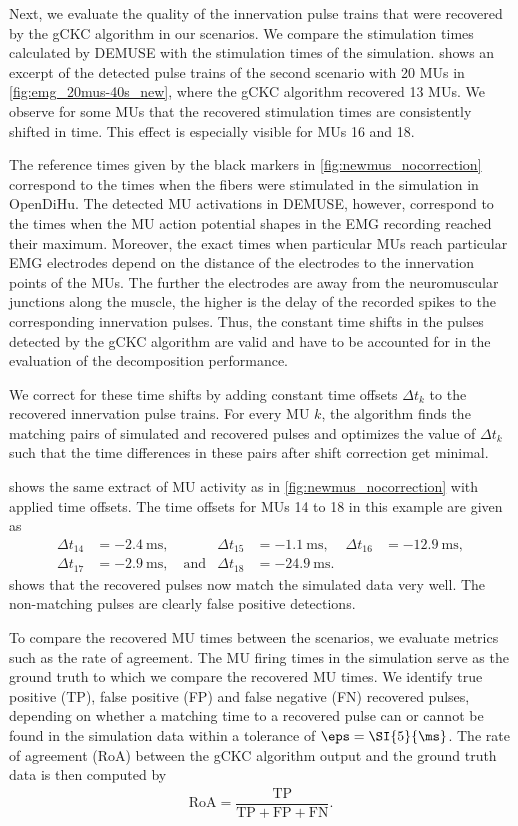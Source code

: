 Next, we evaluate the quality of the innervation pulse trains that were recovered by the gCKC algorithm in our scenarios. We compare the stimulation times calculated by DEMUSE with the stimulation times of the simulation.  shows an excerpt of the detected pulse trains of the second scenario with 20 MUs in \cref{fig:emg_20mus-40s_new}, where the gCKC algorithm recovered 13 MUs.  We observe for some MUs that the recovered stimulation times are consistently shifted in time. This effect is especially visible for MUs 16 and 18. 

The reference times given by the black markers in \cref{fig:newmus_nocorrection} correspond to the times when the fibers were stimulated in the simulation in OpenDiHu. The detected MU activations in DEMUSE, however, correspond to the times when the MU action potential shapes in the EMG recording reached their maximum.
Moreover, the exact times when particular MUs reach particular EMG electrodes  depend on the distance of the electrodes to the innervation points of the MUs. The further the electrodes are away from the neuromuscular junctions along the muscle, the higher is the delay of the recorded spikes to the corresponding innervation pulses. Thus, the constant time shifts in the pulses detected by the gCKC algorithm are valid and have to be accounted for in the evaluation of the decomposition performance.

We correct for these time shifts by adding constant time offsets $\Delta t_k$ to the recovered innervation pulse trains. For every MU $k$, the algorithm finds the matching pairs of simulated and recovered pulses and optimizes the value of $\Delta t_k$ such that the time differences in these pairs after shift correction get minimal.

 shows the same extract of MU activity as in \cref{fig:newmus_nocorrection} with applied time offsets. The time offsets for MUs 14 to 18 in this example are given as
\begin{align*}
    \Delta t_{14}&=\SI{-2.4}{\ms}, & \Delta t_{15}&=\SI{-1.1}{\ms}, & \Delta t_{16}&=\SI{-12.9}{\ms},\\
    \Delta t_{17}&=\SI{-2.9}{\ms}, \quad \text{and} & \Delta t_{18}&=\SI{-24.9}{\ms}.
\end{align*}
 shows that the recovered pulses now match the simulated data very well. The non-matching pulses are clearly false positive detections.

To compare the recovered MU times between the scenarios, we evaluate metrics such as the rate of agreement. The MU firing times in the simulation serve as the ground truth to which we compare the recovered MU times. We identify true positive (TP), false positive (FP) and false negative (FN) recovered pulses, depending on whether a matching time to a recovered pulse can or cannot be found in the simulation data within a tolerance of $\eps=\SI{5}{\ms}$. The rate of agreement (RoA) between the gCKC algorithm output and the ground truth data is then computed by%
\begin{align*}
  \textrm{RoA}  = \dfrac{\textrm{TP}}{\textrm{TP} + \textrm{FP} + \textrm{FN}}.
\end{align*}

